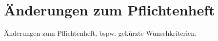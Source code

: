 \section{Änderungen zum Pflichtenheft}

Änderungen zum Pflichtenheft, bspw. gekürzte Wunschkriterien.